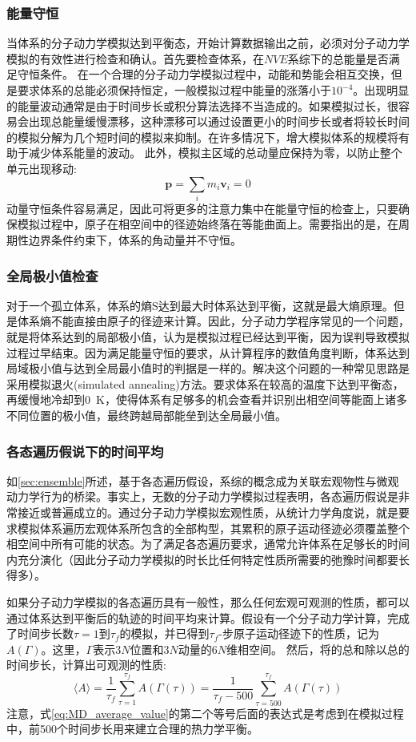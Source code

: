 \subsubsection{能量守恒}
当体系的分子动力学模拟达到平衡态，开始计算数据输出之前，必须对分子动力学模拟的有效性进行检查和确认。首先要检查体系，在$NVE$系综下的总能量是否满足守恒条件。
在一个合理的分子动力学模拟过程中，动能和势能会相互交换，但是要求体系的总能必须保持恒定，一般模拟过程中能量的涨落小于$10^{−4}$。出现明显的能量波动通常是由于时间步长或积分算法选择不当造成的。如果模拟过长，很容易会出现总能量缓慢漂移，这种漂移可以通过设置更小的时间步长或者将较长时间的模拟分解为几个短时间的模拟来抑制。在许多情况下，增大模拟体系的规模将有助于减少体系能量的波动。
此外，模拟主区域的总动量应保持为零，以防止整个单元出现移动:
\begin{equation}
	\mathbf{p}=\sum_im_i\mathbf{v}_i=0
	\label{eq:momentum_conserved}
\end{equation}
动量守恒条件容易满足，因此可将更多的注意力集中在能量守恒的检查上，只要确保模拟过程中，原子在相空间中的径迹始终落在等能曲面上。需要指出的是，在周期性边界条件约束下，体系的角动量并不守恒。
\subsubsection{全局极小值检查}
对于一个孤立体系，体系的熵S达到最大时体系达到平衡，这就是最大熵原理。但是体系熵不能直接由原子的径迹来计算。因此，分子动力学程序常见的一个问题，就是将体系达到的局部极小值，认为是模拟过程已经达到平衡，因为误判导致模拟过程过早结束。因为满足能量守恒的要求，从计算程序的数值角度判断，体系达到局域极小值与达到全局最小值时的判据是一样的。解决这个问题的一种常见思路是采用模拟退火\textrm{(simulated annealing)}方法。要求体系在较高的温度下达到平衡态，再缓慢地冷却到0~\textrm{K}，使得体系有足够多的机会查看并识别出相空间等能面上诸多不同位置的极小值，最终跨越局部能垒到达全局最小值。
\subsubsection{各态遍历假说下的时间平均}
如\ref{sec:ensemble}所述，基于各态遍历假设，系综的概念成为关联宏观物性与微观动力学行为的桥梁。事实上，无数的分子动力学模拟过程表明，各态遍历假说是非常接近或普遍成立的。通过分子动力学模拟宏观性质，从统计力学角度说，就是要求模拟体系遍历宏观体系所包含的全部构型，其累积的原子运动径迹必须覆盖整个相空间中所有可能的状态。为了满足各态遍历要求，通常允许体系在足够长的时间内充分演化（因此分子动力学模拟的时长比任何特定性质所需要的弛豫时间都要长得多）。

如果分子动力学模拟的各态遍历具有一般性，那么任何宏观可观测的性质，都可以通过体系达到平衡后的轨迹的时间平均来计算。假设有一个分子动力学计算，完成了时间步长数$\tau=1$到$\tau_f$的模拟，并已得到$\tau_f$-步原子运动径迹下的性质，记为$A(\Gamma)$。这里，$\Gamma$表示3$N$位置和3$N$动量的6$N$维相空间。
然后，将的总和除以总的时间步长，计算出可观测的性质:
\begin{equation}
	\langle A\rangle=\dfrac1{\tau_f}\sum_{\tau=1}^{\tau_f}A(\Gamma(\tau))=\dfrac1{\tau_f-500}\sum_{\tau=500}^{\tau_f}A(\Gamma(\tau))
	\label{eq:MD_average_value}
\end{equation}
注意，式\eqref{eq:MD_average_value}的第二个等号后面的表达式是考虑到在模拟过程中，前500个时间步长用来建立合理的热力学平衡。%

